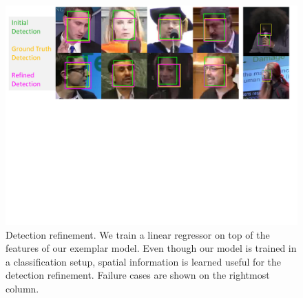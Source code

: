 \documentclass[letterpaper]{article} %
\begin{document}
 \begin{figure}[t]
 \begin{center}
   \includegraphics[width=1\linewidth]{fig/Detection.pdf}
 \end{center}
   \caption{Detection refinement. We train a linear regressor on top of the features of our exemplar model. Even though our model is trained in a classification setup, spatial information is learned useful for the detection refinement. Failure cases are shown on the rightmost column.}
 \label{fig:detref}
 \end{figure}
\end{document}
